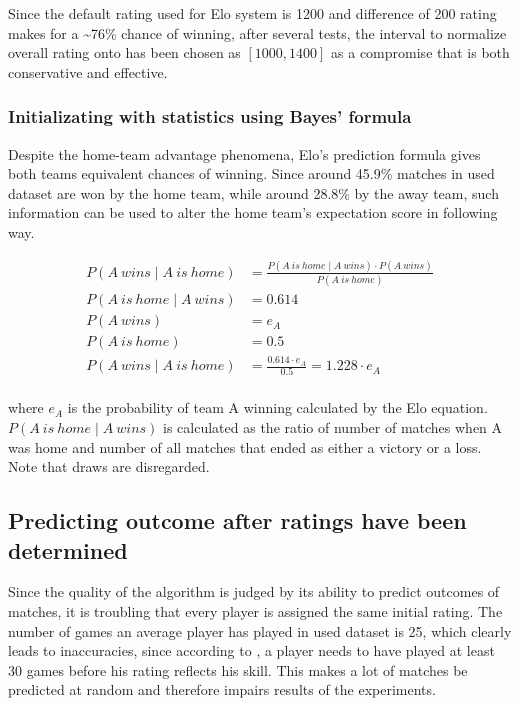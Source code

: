 Since the default rating used for Elo system is 1200 and difference of 200 rating makes for a \textasciitilde 76\% chance of winning, after several tests, the interval to normalize overall rating onto has been chosen as $[1000, 1400]$ as a compromise that is both conservative and effective.

\subsubsection{Initializating with statistics using Bayes' formula}
Despite the home-team advantage phenomena, Elo's prediction formula gives both teams equivalent chances of winning. Since around 45.9\% matches in used dataset are won by the home team, while around 28.8\% by the away team, such information can be used to alter the home team's expectation score in following way.

\begin{align*}
P(A\ wins \mid A\ is\ home) &= \frac{P(A\ is\ home \mid A\ wins)\cdot P(A\ wins)}{P(A\ is\ home)}\\
P(A\ is\ home \mid A\ wins) &= 0.614\\
P(A\ wins) &= e_A\\
P(A\ is\ home) &= 0.5\\
P(A\ wins \mid A\ is\ home) &= \frac{0.614\cdot e_A}{0.5} = 1.228\cdot e_A\\
\end{align*}

\noindent where $e_A$ is the probability of team A winning calculated by the Elo equation. $P(A\ is\ home \mid A\ wins)$ is calculated as the ratio of number of matches when A was home and number of all matches that ended as either a victory or a loss. Note that draws are disregarded.

\subsection{Predicting outcome after ratings have been determined}
Since the quality of the algorithm is judged by its ability to predict outcomes of matches, it is troubling that every player is assigned the same initial rating. The number of games an average player has played in used dataset is 25, which clearly leads to inaccuracies, since according to \citet{Eloratingchessplayerspresent1978}, a player needs to have played at least 30 games before his rating reflects his skill. This makes a lot of matches be predicted at random and therefore impairs results of the experiments.

